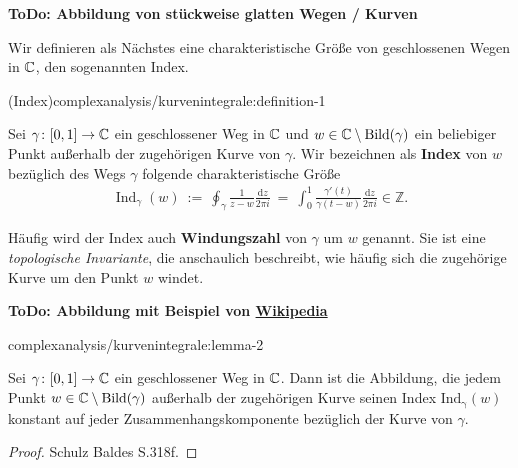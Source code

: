 \par
\textbf{ToDo: Abbildung von stückweise glatten Wegen / Kurven}

\par
Wir definieren als Nächstes eine charakteristische Größe von geschlossenen Wegen in \(\mathbb{C}\), den sogenannten Index.
\begin{definition}{(Index)}{complexanalysis/kurvenintegrale:definition-1}



\par
Sei \(\gamma \colon [0,1] \rightarrow \mathbb{C}\) ein geschlossener Weg in \(\mathbb{C}\) und \(w \in \mathbb{C} \setminus \operatorname{Bild}(\gamma)\) ein beliebiger Punkt außerhalb der zugehörigen Kurve von \(\gamma\).
Wir bezeichnen als \textbf{Index} von \(w\) bezüglich des Wegs \(\gamma\) folgende charakteristische Größe
\begin{align*}
\operatorname{Ind}_\gamma(w) \ := \ \oint_\gamma \frac{1}{z - w} \frac{\mathrm{d}z}{2\pi i} \ = \ \int_0^1 \frac{\gamma'(t)}{\gamma(t - w)} \frac{\mathrm{d}z}{2\pi i} \in \mathbb{Z}.
\end{align*}
\par
Häufig wird der Index auch \textbf{Windungszahl} von \(\gamma\) um \(w\) genannt.
Sie ist eine \emph{topologische Invariante}, die anschaulich beschreibt, wie häufig sich die zugehörige Kurve um den Punkt \(w\) windet.
\end{definition}

\par
\textbf{ToDo: Abbildung mit Beispiel von \href{https://de.wikipedia.org/wiki/Umlaufzahl\_(Mathematik)}{Wikipedia}}
\begin{lemma}{}{complexanalysis/kurvenintegrale:lemma-2}



\par
Sei \(\gamma \colon [0,1] \rightarrow \mathbb{C}\) ein geschlossener Weg in \(\mathbb{C}\).
Dann ist die Abbildung, die jedem Punkt \(w \in \mathbb{C} \setminus \operatorname{Bild}(\gamma)\) außerhalb der zugehörigen Kurve seinen Index \(\operatorname{Ind_\gamma}(w)\) konstant auf jeder Zusammenhangskomponente bezüglich der Kurve von \(\gamma\).
\end{lemma}

\begin{proof}
 Schulz Baldes S.318f.
\end{proof}


